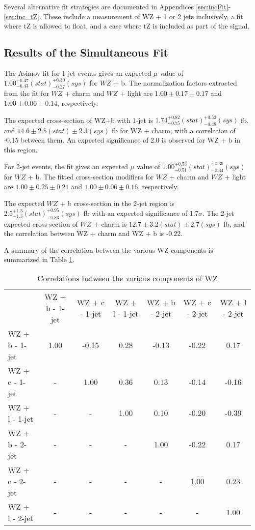 Several alternative fit strategies are documented in Appendices \ref{sec:incFit}-\ref{sec:inc_tZ}. These include a measurement of WZ + 1 or 2 jets inclusively, a fit where tZ is allowed to float, and a case where tZ is included as part of the signal.

\subsection{Results of the Simultaneous Fit}
\label{sec:resSum}

The Asimov fit for 1-jet events gives an expected $\mu$ value of $1.00^{+0.47}_{-0.43}(stat)^{+0.30}_{-0.27}(sys)$ for $WZ$ + b. The normalization factors extracted from the fit for $WZ$ + charm and $WZ$ + light are $1.00 \pm 0.17 \pm 0.17$ and $1.00 \pm 0.06 \pm 0.14 $, respectively.

The expected cross-section of WZ+b with 1-jet is $1.74^{+0.82}_{-0.75}(stat)^{+0.53}_{-0.48}(sys)$ fb, and $14.6 \pm 2.5 (stat) \pm 2.3 (sys)$ fb for WZ + charm, with a correlation of -0.15 between them. An expected significance of 2.0 is observed for WZ + b in this region. 

For 2-jet events, the fit gives an expected $\mu$ value of $1.00^{+0.53}_{-0.51}(stat)^{+0.39}_{-0.34}(sys)$ for $WZ$ + b. The fitted cross-section modifiers for $WZ$ + charm and $WZ$ + light are $1.00 \pm 0.25 \pm 0.21$ and $1.00 \pm 0.06 \pm 0.16 $, respectively.

The expected $WZ$ + b cross-section in the 2-jet region is $2.5^{+1.3}_{-1.3}(stat)^{+0.95}_{-0.83}(sys)$ fb with an expected significance of 1.7$\sigma$. The 2-jet expected cross-section of $WZ$ + charm is $12.7 \pm 3.2 (stat) \pm 2.7 (sys)$ fb, and the correlation between WZ + charm and WZ + b is -0.22. 

A summary of the correlation between the various WZ components is summarized in Table \ref{tab:WZ_corr}.

\hspace{-1in}\begin{table}[H]
\begin{adjustwidth}{-3em}{-3em}
\begin{center}
\begin{tabular}{l|cccccc}
\hline
 & WZ + b - 1-jet & WZ + c - 1-jet & WZ + l - 1-jet & WZ + b - 2-jet & WZ + c - 2-jet & WZ + l - 2-jet\\
WZ + b - 1-jet & 1.00 & -0.15 & 0.28 & -0.13 & -0.22 & 0.17 \\
WZ + c - 1-jet & - & 1.00 & 0.36 & 0.13 & -0.14 & -0.16 \\
WZ + l - 1-jet & - & - & 1.00 & 0.10 & -0.20 & -0.39 \\
WZ + b - 2-jet & - & - & - & 1.00 & -0.22 & 0.17 \\
WZ + c - 2-jet & - & - & - & - & 1.00 & 0.23 \\
WZ + l - 2-jet & - & - & - & - & - & 1.00 \\
\hline
\end{tabular}
\caption{Correlations between the various components of WZ}
\label{tab:WZ_corr}
\end{center}
\end{adjustwidth}
\end{table}


